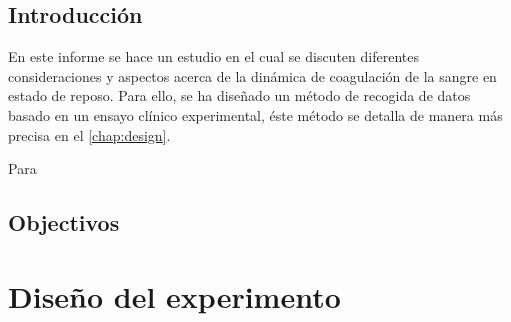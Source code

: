 \documentclass[a4paper,11pt,twoside]{report}\usepackage[]{graphicx}\usepackage[]{color}
\newcommand{\breakline}{\par\vspace{0.2cm}}
\begin{document}
\section{Introducción}
\label{sec:intro}
En este informe se hace un estudio en el cual se discuten diferentes consideraciones y aspectos acerca de la dinámica de coagulación de la sangre en estado de reposo. Para ello, se ha diseñado un método de recogida de datos basado en un ensayo clínico experimental, éste método se detalla de manera más precisa en el \autoref{chap:design}. \breakline
Para 

\section{Objectivos}
\label{sec:obj}



\chapter{Diseño del experimento}
\label{chap:design}

\minitoc



\end{document}
